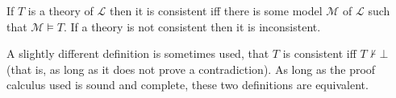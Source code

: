 \documentclass[12pt]{article}
\begin{document}
If $T$ is a theory of $\mathcal{L}$ then it is consistent iff there is some model $\mathcal{M}$ of $\mathcal{L}$ such that $\mathcal{M}\vDash T$.  If a theory is not consistent then it is inconsistent.

A slightly different definition is sometimes used, that $T$ is consistent iff $T\not\vdash\bot$ (that is, as long as it does not prove a contradiction).  As long as the proof calculus used is sound and complete, these two definitions are equivalent.
\end{document}
